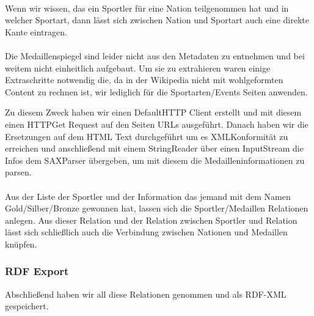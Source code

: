 \documentclass[pagesize=auto, titlepage=on]{scrartcl}
\begin{document}
\paragraph{}
Wenn wir wissen, das ein Sportler für eine Nation teilgenommen hat und in welcher Sportart, dann lässt sich zwischen Nation und Sportart auch eine direkte Kante eintragen.


\paragraph{}
Die Medaillenspiegel sind leider nicht aus den Metadaten zu entnehmen und bei weitem nicht einheitlich aufgebaut.
Um sie zu extrahieren waren einige Extraschritte notwendig die, da in der Wikipedia nicht mit wohlgeformten Content zu rechnen ist, wir lediglich für die Sportarten/Events Seiten anwenden.

Zu diesem Zweck haben wir einen DefaultHTTP Client erstellt und mit diesem einen HTTPGet Request auf den Seiten URLs ausgeführt.
Danach haben wir die Ersetzungen auf dem HTML Text durchgeführt um es XMLKonformität zu erreichen und anschließend 
mit einem StringReader über einen InputStream die Infos dem SAXParser übergeben, um mit diesem die Medailleninformationen zu parsen.
\paragraph{}
Aus der Liste der Sportler und der Information das jemand mit dem Namen Gold/Silber/Bronze gewonnen hat, lassen sich die Sportler/Medaillen Relationen anlegen.
Aus dieser Relation und der Relation zwischen Sportler und Relation lässt sich schließlich auch die Verbindung zwischen Nationen und Medaillen knüpfen.
\subsubsection  {RDF Export}
Abschließend haben wir all diese Relationen genommen und als  RDF-XML gespeichert.
\end{document}
